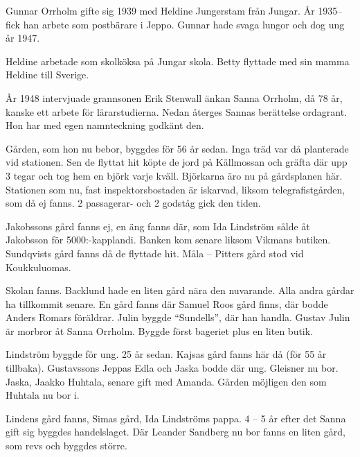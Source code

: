 Gunnar Orrholm gifte sig 1939 med Heldine Jungerstam från Jungar. År 1935-- fick han arbete som postbärare i Jeppo. Gunnar hade svaga lungor och dog ung år 1947.
\begin{jhchildren}
  \item {}
  \item {}
\end{jhchildren}
Heldine arbetade som skolköksa på Jungar skola. Betty flyttade med sin mamma Heldine till Sverige.



År 1948 intervjuade grannsonen Erik Stenwall änkan Sanna Orrholm, då 78 år, kanske ett arbete för lärarstudierna. Nedan återges Sannas berättelse ordagrant. Hon har med egen namnteckning godkänt den.


Gården, som hon nu bebor, byggdes för 56 år sedan. Inga träd var då planterade vid stationen. Sen de flyttat hit köpte de jord på Källmossan och gräfta där upp 3 tegar och tog hem en björk varje kväll. Björkarna äro nu på gårdsplanen här.
Stationen som nu, fast inspektorsbostaden är iskarvad, liksom telegrafistgården, som då ej fanns. 2 passagerar- och 2 godståg gick den tiden.

Jakobssons gård fanns ej, en äng fanns där, som Ida Lindström sålde åt Jakobsson för 5000:-kapplandi. Banken kom senare liksom Vikmans butiken. Sundqvists gård fanns då de flyttade hit. Måla – Pitters gård stod vid Koukkuluomas.

Skolan fanns. Backlund hade en liten gård nära den nuvarande. Alla andra gårdar ha tillkommit senare. En gård fanns där Samuel Roos gård finns, där bodde Anders Romars föräldrar. Julin byggde ``Sundells'', där han handla. Gustav Julin är morbror åt Sanna Orrholm. Byggde först bageriet plus en liten butik.

Lindström byggde för ung. 25 år sedan. Kajsas gård fanns här då (för 55 år tillbaka). Gustavssons Jeppas Edla och Jaska bodde där ung. Gleisner nu bor. Jaska, Jaakko Huhtala, senare gift med Amanda. Gården möjligen den som Huhtala nu bor i.

Lindens gård fanns, Simas gård, Ida Lindströms pappa. 4 – 5 år efter det Sanna gift sig byggdes handelslaget. Där Leander Sandberg nu bor fanns en liten gård, som revs och byggdes större.

